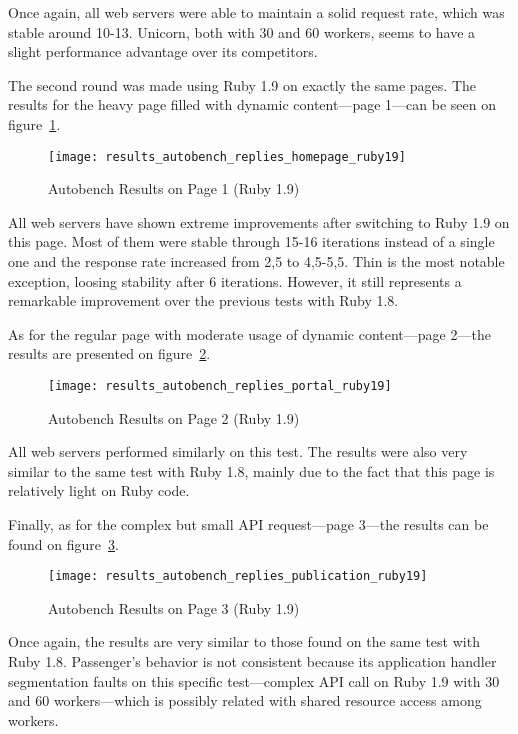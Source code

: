 Once again, all web servers were able to maintain a solid request rate, which was stable around 10-13. Unicorn, both with 30 and 60 workers, seems to have a slight performance advantage over its competitors.

The second round was made using Ruby 1.9 on exactly the same pages. The results for the heavy page filled with dynamic content---page 1---can be seen on figure~\ref{fig:page1_autobench_ruby19_results}.
\begin{figure}[h!]
  \centering
    \caption{Autobench Results on Page 1 (Ruby 1.9)}
    \texttt{[image: results\_autobench\_replies\_homepage\_ruby19]}
  \label{fig:page1_autobench_ruby19_results}
\end{figure}

All web servers have shown extreme improvements after switching to Ruby 1.9 on this page. Most of them were stable through 15-16 iterations instead of a single one and the response rate increased from 2,5 to 4,5-5,5. Thin is the most notable exception, loosing stability after 6 iterations. However, it still represents a remarkable improvement over the previous tests with Ruby 1.8.

As for the regular page with moderate usage of dynamic content---page 2---the results are presented on figure~\ref{fig:page2_autobench_ruby19_results}.
\begin{figure}[h!]
  \centering
    \caption{Autobench Results on Page 2 (Ruby 1.9)}
    \texttt{[image: results\_autobench\_replies\_portal\_ruby19]}
  \label{fig:page2_autobench_ruby19_results}
\end{figure}

All web servers performed similarly on this test. The results were also very similar to the same test with Ruby 1.8, mainly due to the fact that this page is relatively light on Ruby code.

Finally, as for the complex but small API request---page 3---the results can be found on figure~\ref{fig:page3_autobench_ruby19_results}.
\begin{figure}[h!]
  \centering
    \caption{Autobench Results on Page 3 (Ruby 1.9)}
    \texttt{[image: results\_autobench\_replies\_publication\_ruby19]}
  \label{fig:page3_autobench_ruby19_results}
\end{figure}

Once again, the results are very similar to those found on the same test with Ruby 1.8. Passenger's behavior is not consistent because its application handler segmentation faults on this specific test---complex API call on Ruby 1.9 with 30 and 60 workers---which is possibly related with shared resource access among workers.

